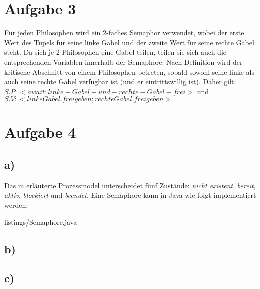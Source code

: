 \documentclass[11pt,a4paper,DIV=10,]{scrartcl}
\begin{document}
\section*{Aufgabe 3}

Für jeden Philosophen wird ein 2-faches Semaphor verwendet, wobei der erste Wert des Tupels für seine linke Gabel und der zweite Wert für seine rechte Gabel steht.  Da sich je 2 Philosophen eine Gabel teilen, teilen sie sich auch die entsprechenden Variablen innerhalb der Semaphore. Nach Definition wird der kritische Abschnitt von einem Philosophen betreten, sobald sowohl seine linke als auch seine rechte Gabel verfügbar ist (und er eintrittswillig ist). Daher gilt: $S.P: < await: linke-Gabel-und-rechte-Gabel-frei> $ und $S.V: <linkeGabel.freigeben; rechteGabel.freigeben >$


\section*{Aufgabe 4}
\subsection*{a)}
Das in \citep{Maurer.2012} erläuterte Prozessmodel unterscheidet fünf Zustände: \textit{nicht existent}, \textit{bereit}, \textit{aktiv}, \textit{blockiert} und \textit{beendet}.
Eine Semaphore kann in Java wie folgt implementiert werden:

{listings/Semaphore.java}
\subsection*{b)}
\subsection*{c)}



\end{document}
